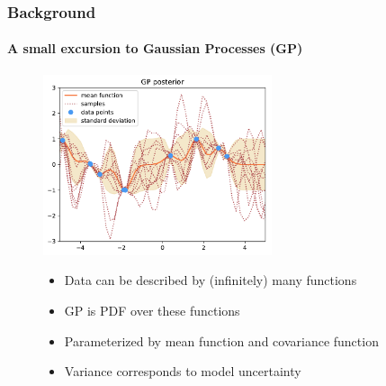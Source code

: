 \documentclass[9pt]{beamer}
\begin{document}
\begin{frame}
\frametitle{Background}
\framesubtitle{A small excursion to Gaussian Processes (GP)}
\begin{figure}
	\centering
	\includegraphics[width=0.6\textwidth]{images/post.pdf}
	\begin{itemize}
		\item Data can be described by (infinitely) many functions
		\item GP is PDF over these functions
		\item Parameterized by mean function and covariance function
		\item Variance corresponds to model uncertainty
	\end{itemize}
\end{figure}
\end{frame}
\end{document}
